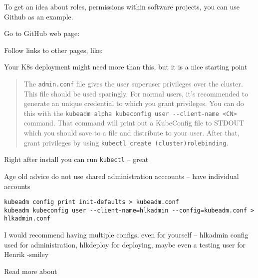 \documentclass[Screen16to9,17pt]{foils}
\begin{document}

To get an idea about roles, permissions within software projects, you can use Github as an example.

\begin{list2}
\item
Go to GitHub web page:\\
\item Follow links to other pages, like:\\
\item Your K8s deployment might need more than this, but it is a nice starting point
\end{list2}




\begin{quote}
The \verb+admin.conf+ file gives the user superuser privileges over the cluster. This file should be used sparingly. For normal users, it's recommended to generate an unique credential to which you grant privileges. You can do this with the \verb+kubeadm alpha kubeconfig user --client-name <CN>+ command. That command will print out a KubeConfig file to STDOUT which you should save to a file and distribute to your user. After that, grant privileges by using \verb+kubectl create (cluster)rolebinding+.
\end{quote}

\begin{list2}
\item Right after install you can run \faWrench \verb+kubectl+ -- great
\item Age old advice do not use shared administration acccounts -- have individual accounts
\end{list2}



\begin{verbatim}
kubeadm config print init-defaults > kubeadm.conf
kubeadm kubeconfig user --client-name=hlkadmin --config=kubeadm.conf > hlkadmin.conf
\end{verbatim}

\begin{list2}
\item I would recommend having multiple configs, even for yourself -- hlkadmin config used for administration, hlkdeploy for deploying, maybe even a testing user for Henrik -smiley
\item Read more about 
\end{list2}
\end{document}
